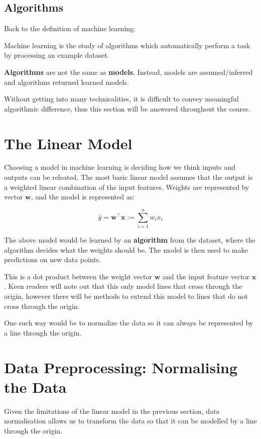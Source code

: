 \subsection{Algorithms}
Back to the definition of machine learning:
\begin{tcolorbox}[title=Professor, colback=yellow!20!white, colframe=orange!35!black, sharp corners]
    Machine learning is the study of algorithms which automatically perform a task by processing an example dataset.
\end{tcolorbox}

\textbf{Algorithms} are not the same as \textbf{models}. Instead, models are assumed/inferred and algorithms returned learned models.

Without getting into many technicalities, it is difficult to convey meaningful algorithmic difference, thus this section will be answered throughout the course.

\section{The Linear Model}

Choosing a model in machine learning is deciding how we think inputs and outputs can be releated. The most basic linear model assumes that the output is a weighted linear combination of the input features. Weights are represented by vector $\bm{w}$, and the model is represented as:

\begin{equation}
    \hat{y} = \bm{w}^\top \bm{x}  := \sum_{i=1}^{n} w_i x_i
\end{equation}

The above model would be learned by an \textbf{algorithm} from the dataset, where the algorithm decides what the weights should be. The model is then used to make predictions on new data points. \bigskip

This is a dot product between the weight vector $\bm{w}$ and the input feature vector $\bm{x}$. Keen readers will note out that this only model lines that cross through the origin, however there will be methods to extend this model to lines that do not cross through the origin. \bigskip

One such way would be to normalize the data so it can always be represented by a line through the origin.

\section{Data Preprocessing: Normalising the Data}
Given the limitations of the linear model in the previous section, data normalisation allows us to transform the data so that it can be modelled by a line through the origin.

